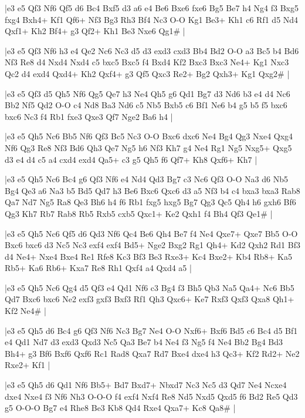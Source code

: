 \whitename{}
\blackname{}
\makegametitle
|e3 e5 Qf3 Nf6 Qf5 d6 Bc4 Bxf5 d3 a6 e4 Be6 Bxe6 fxe6 Bg5 Be7 h4 Ng4 f3 Bxg5 fxg4 Bxh4+ Kf1 Qf6+ Nf3 Bg3 Rh3 Bf4 Nc3 O-O Kg1 Be3+ Kh1 c6 Rf1 d5 Nd4 Qxf1+ Kh2 Bf4+ g3 Qf2+ Kh1 Be3 Nxe6 Qg1\#  |

\whitename{}
\blackname{}
\makegametitle
|e3 e5 Qf3 Nf6 h3 e4 Qe2 Nc6 Nc3 d5 d3 exd3 cxd3 Bb4 Bd2 O-O a3 Bc5 b4 Bd6 Nf3 Re8 d4 Nxd4 Nxd4 c5 bxc5 Bxc5 f4 Bxd4 Kf2 Bxc3 Bxc3 Ne4+ Kg1 Nxc3 Qc2 d4 exd4 Qxd4+ Kh2 Qxf4+ g3 Qf5 Qxc3 Re2+ Bg2 Qxh3+ Kg1 Qxg2\#  |

\whitename{}
\blackname{}
\makegametitle
|e3 e5 Qf3 d5 Qh5 Nf6 Qg5 Qe7 h3 Ne4 Qh5 g6 Qd1 Bg7 d3 Nd6 b3 e4 d4 Nc6 Bb2 Nf5 Qd2 O-O c4 Nd8 Ba3 Nd6 c5 Nb5 Bxb5 c6 Bf1 Ne6 b4 g5 b5 f5 bxc6 bxc6 Nc3 f4 Rb1 fxe3 Qxe3 Qf7 Nge2 Ba6 h4  |

\whitename{}
\blackname{}
\makegametitle
|e3 e5 Qh5 Nc6 Bb5 Nf6 Qf3 Bc5 Nc3 O-O Bxc6 dxc6 Ne4 Bg4 Qg3 Nxe4 Qxg4 Nf6 Qg3 Re8 Nf3 Bd6 Qh3 Qe7 Ng5 h6 Nf3 Kh7 g4 Ne4 Rg1 Ng5 Nxg5+ Qxg5 d3 e4 d4 c5 a4 cxd4 exd4 Qa5+ c3 g5 Qh5 f6 Qf7+ Kh8 Qxf6+ Kh7  |

\whitename{}
\blackname{}
\makegametitle
|e3 e5 Qh5 Nc6 Bc4 g6 Qf3 Nf6 e4 Nd4 Qd3 Bg7 c3 Nc6 Qf3 O-O Na3 d6 Nb5 Bg4 Qe3 a6 Na3 b5 Bd5 Qd7 h3 Be6 Bxc6 Qxc6 d3 a5 Nf3 b4 c4 bxa3 bxa3 Rab8 Qa7 Nd7 Ng5 Ra8 Qe3 Bh6 h4 f6 Rb1 fxg5 hxg5 Bg7 Qg3 Qc5 Qh4 h6 gxh6 Bf6 Qg3 Kh7 Rb7 Rab8 Rb5 Rxb5 cxb5 Qxc1+ Ke2 Qxh1 f4 Bh4 Qf3 Qe1\#  |

\whitename{}
\blackname{}
\makegametitle
|e3 e5 Qh5 Nc6 Qf5 d6 Qd3 Nf6 Qc4 Be6 Qh4 Be7 f4 Ne4 Qxe7+ Qxe7 Bb5 O-O Bxc6 bxc6 d3 Nc5 Nc3 exf4 exf4 Bd5+ Nge2 Bxg2 Rg1 Qh4+ Kd2 Qxh2 Rd1 Bf3 d4 Ne4+ Nxe4 Bxe4 Re1 Rfe8 Kc3 Bf3 Be3 Rxe3+ Kc4 Bxe2+ Kb4 Rb8+ Ka5 Rb5+ Ka6 Rb6+ Kxa7 Re8 Rh1 Qxf4 a4 Qxd4 a5  |

\whitename{}
\blackname{}
\makegametitle
|e3 e5 Qh5 Nc6 Qg4 d5 Qf3 e4 Qd1 Nf6 c3 Bg4 f3 Bh5 Qb3 Na5 Qa4+ Nc6 Bb5 Qd7 Bxc6 bxc6 Ne2 exf3 gxf3 Bxf3 Rf1 Qh3 Qxc6+ Ke7 Rxf3 Qxf3 Qxa8 Qh1+ Kf2 Ne4\#  |

\whitename{}
\blackname{}
\makegametitle
|e3 e5 Qh5 d6 Bc4 g6 Qf3 Nf6 Nc3 Bg7 Ne4 O-O Nxf6+ Bxf6 Bd5 c6 Bc4 d5 Bf1 e4 Qd1 Nd7 d3 exd3 Qxd3 Nc5 Qa3 Be7 b4 Ne4 f3 Ng5 f4 Ne4 Bb2 Bg4 Bd3 Bh4+ g3 Bf6 Bxf6 Qxf6 Rc1 Rad8 Qxa7 Rd7 Bxe4 dxe4 h3 Qc3+ Kf2 Rd2+ Ne2 Rxe2+ Kf1  |

\whitename{}
\blackname{}
\makegametitle
|e3 e5 Qh5 d6 Qd1 Nf6 Bb5+ Bd7 Bxd7+ Nbxd7 Nc3 Nc5 d3 Qd7 Ne4 Ncxe4 dxe4 Nxe4 f3 Nf6 Nh3 O-O-O f4 exf4 Nxf4 Re8 Nd5 Nxd5 Qxd5 f6 Bd2 Re5 Qd3 g5 O-O-O Bg7 e4 Rhe8 Be3 Kb8 Qd4 Rxe4 Qxa7+ Kc8 Qa8\#  |

